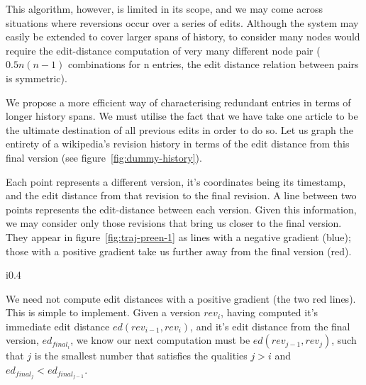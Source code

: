 This algorithm, however, is limited in its scope, and we may come
across situations where reversions occur over a series of
edits. Although the system may easily be extended to cover larger
spans of history, to consider many nodes would require the
edit-distance computation of very many different node pair
($0.5n(n-1)$ combinations for n entries, the edit distance relation
between pairs is symmetric).

We propose a more efficient way of characterising redundant
entries in terms of longer history spans. We must utilise the fact
that we have take one article to be the ultimate destination of all
previous edits in order to do so. Let us graph the entirety of a
wikipedia's revision history in terms of the edit distance from this
final version (see figure~\ref{fig:dummy-history}).

Each point represents a different version, it's coordinates being its
timestamp, and the edit distance from that revision to the final
revision. A line between two points represents the edit-distance
between each version. Given this information, we may consider only
those revisions that bring us closer to the final version. They appear
in figure~\ref{fig:traj-preen-1} as lines with a negative gradient
(blue); those with a positive gradient take us further away from the
final version (red).

\begin{wrapfigure}{i}{0.4\textwidth}
  \centering
  \pgfplotsset{width=0.4\textwidth}
  \caption{Graph showing a `trajectory plot'}
  \label{fig:dummy-history}
\end{wrapfigure}

We need not compute edit distances with a positive gradient (the two
red lines). This is simple to implement. Given a version $rev_i$, having
computed it's immediate edit distance $ed(rev_{i-1},rev_i)$, and it's edit
distance from the final version, $ed_{final_i}$, we know our next
computation must be $ed(rev_{j-1},rev_j)$, such that $j$ is the smallest
number that satisfies the qualities $j > i$ and $ed_{final_j} <
ed_{final_{j-1}}$.

